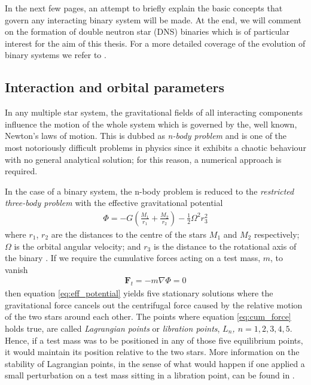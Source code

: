 \documentclass[../../main/thesis_msc.tex]{subfiles}
\begin{document}
		In the next few pages, an attempt to briefly explain the basic concepts that govern any interacting binary system will be made. At the end, we will comment on the formation of double neutron star (DNS) binaries which is of particular interest for the aim of this thesis. For a more detailed coverage of the evolution of binary systems we refer to \cite{Ivanova2015, podsiadlowski_2014, Postnov2014, Eggleton_book, Tauris_2006}.
		
			\subsection{Interaction and orbital parameters}
			
				In any multiple star system, the gravitational fields of all interacting components influence the motion of the whole system which is governed by the, well known, Newton's laws of motion. This is dubbed as \emph{n-body problem} and is one of the most notoriously difficult problems in physics since it exhibits a chaotic behaviour with no general analytical solution; for this reason, a numerical approach is required.

				In the case of a binary system, the n-body problem is reduced to the \emph{restricted three-body problem} with the effective gravitational potential 
					\begin{eqnarray}
						\label{eq:eff_potential}
						\Phi = -G \left( \frac{M_1}{r_1} + \frac{M_2}{r_2} \right) - \frac{1}{2} \Omega^2 r_3^2
					\end{eqnarray}
					where $r_1$, $r_2$ are the distances to the centre of the stars $M_1$ and $M_2$ respectively; $\Omega$ is the orbital angular velocity; and $r_3$ is the distance to the rotational axis of the binary \citep[p.~639]{Tauris_2006}. If we require the cumulative forces acting on a test mass, $m$, to vanish
					\begin{eqnarray}
						\label{eq:cum_force}
						\pmb{F}_t = -m \nabla \Phi = 0
					\end{eqnarray}
				then equation \ref{eq:eff_potential} yields five stationary solutions where the gravitational force cancels out the centrifugal force caused by the relative motion of the two stars around each other. The points where equation \ref{eq:cum_force} holds true, are called \emph{Lagrangian points} or \emph{libration points}, \emph{$L_n$, $n=1,2,3,4,5$}. Hence, if a test mass was to be positioned in any of those five equilibrium points, it would maintain its position relative to the two stars. More information on the stability of Lagrangian points, in the sense of what would happen if one applied a small perturbation on a test mass sitting in a libration point, can be found in \cite{Szebehely, Celletti1990, Schwarz2012}.
				
\end{document}
